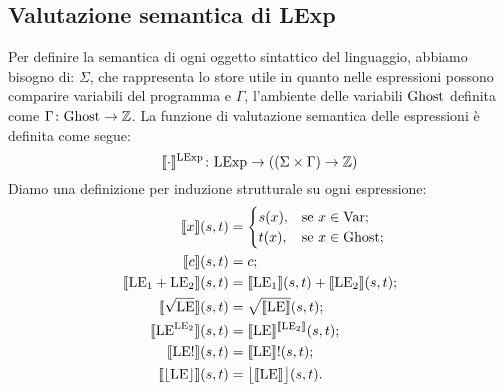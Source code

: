 \subsection{Valutazione semantica di LExp}
Per definire la semantica di ogni oggetto sintattico del linguaggio, abbiamo bisogno di: $\Sigma$, che rappresenta lo store utile in quanto nelle espressioni possono comparire variabili del programma e $\Gamma$, l'ambiente delle variabili $\mathrm{Ghost}$ definita come $\mathord{\Gamma}\colon\mathrm{Ghost}\to\mathbb{Z}$.
La funzione di valutazione semantica delle espressioni è definita come segue:
\[
   \mathord{\llbracket \cdot \rrbracket ^{\mathrm{LExp}}}\colon\mathrm{LExp}\to((\Sigma \times \Gamma) \rightarrow \mathbb{Z})
\]
Diamo una definizione per induzione strutturale su ogni espressione:
\begin{align*}
   \llbracket x \rrbracket(s,t)
      &=
        \begin{cases}
                 s(x), &\text{se $x \in \mathrm{Var}$};\\
                 t(x), &\text{se $x \in \mathrm{Ghost}$};
        \end{cases}\\
   \llbracket  c \rrbracket(s,t)
     &=  c;\\
   \llbracket \mathrm{LE}_1 + \mathrm{LE}_2 \rrbracket(s,t)
     &= \llbracket \mathrm{LE}_1 \rrbracket(s,t) + \llbracket \mathrm{LE}_2 \rrbracket(s,t);\\
   \llbracket \sqrt{\mathrm{LE}} \rrbracket(s,t)
     &= \sqrt{\llbracket \mathrm{LE} \rrbracket}(s,t);\\
   \llbracket \mathrm{LE}^{\mathrm{LE}_2} \rrbracket(s,t)
     &= \llbracket \mathrm{LE} \rrbracket^{\llbracket \mathrm{LE}_2 \rrbracket}(s,t);\\
   \llbracket \mathrm{LE}! \rrbracket(s,t)
     &= \llbracket \mathrm{LE} \rrbracket!(s,t);\\
   \llbracket \lfloor \mathrm{LE} \rfloor \rrbracket(s,t)
     &= \bigl \lfloor \llbracket \mathrm{LE} \rrbracket \bigr \rfloor(s,t).
\end{align*}

